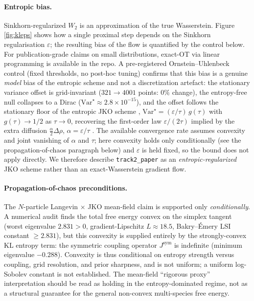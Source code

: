 \documentclass[11pt]{article}
\begin{document}
\paragraph{Entropic bias.} Sinkhorn-regularized $W_2$ is an approximation
of the true Wasserstein. Figure \ref{fig:kleps} shows how a single
proximal step depends on the Sinkhorn regularisation $\varepsilon$; the
resulting bias of the flow is quantified by the control below. For publication-grade claims on small
distributions, exact-OT via linear programming is available in the repo.
A pre-registered Ornstein--Uhlenbeck control (fixed thresholds, no
post-hoc tuning) confirms that this bias is a genuine \emph{model} bias of
the entropic scheme and not a discretization artefact: the stationary
variance offset is grid-invariant ($321 \to 4001$ points: $0\%$ change),
the entropy-free null collapses to a Dirac ($\mathrm{Var}^\star \approx
2.8\times10^{-15}$), and the offset follows the stationary floor of the
entropic JKO scheme \cite{peyre2015entropic},
$\mathrm{Var}^\star = (\varepsilon/\tau)\,g(\tau)$ with $g(\tau)\to 1/2$ as
$\tau\to 0$, recovering the first-order law $\varepsilon/(2\tau)$ implied by
the extra diffusion $\tfrac{\alpha}{2}\Delta\rho$, $\alpha=\varepsilon/\tau$
\cite{baradat2025sinkhorn}. The available convergence rate
\cite{baradat2026rate} assumes convexity and joint vanishing of
$\alpha$ and $\tau$; here convexity holds only conditionally (see the
propagation-of-chaos paragraph below) and $\varepsilon$ is held fixed, so
the bound does not apply directly.
We therefore describe \texttt{track2\_paper} as an
\emph{entropic-regularized} JKO scheme rather than an exact-Wasserstein
gradient flow.

\paragraph{Propagation-of-chaos preconditions.} The $N$-particle
Langevin $\times$ JKO mean-field claim is supported only
\emph{conditionally}. A numerical audit finds the total free energy convex
on the simplex tangent (worst eigenvalue $2.831 > 0$, gradient-Lipschitz
$L \approx 18.5$, Bakry--\'Emery LSI constant $\geq 2.831$), but this
convexity is supplied entirely by the strongly-convex KL entropy term: the
symmetric coupling operator $J^{\mathrm{sym}}$ is indefinite (minimum
eigenvalue $-0.288$). Convexity is thus conditional on entropy strength
versus coupling, grid resolution, and prior sharpness, and is not uniform;
a uniform log-Sobolev constant is not established. The mean-field
``rigorous proxy'' interpretation should be read as holding in the
entropy-dominated regime, not as a structural guarantee for the general
non-convex multi-species free energy.
\end{document}
